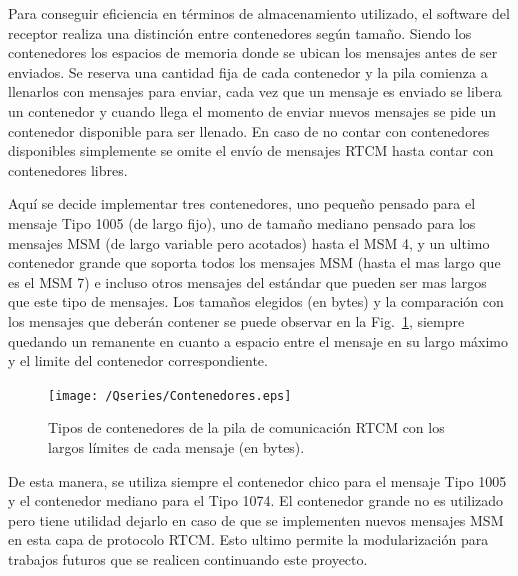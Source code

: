 \documentclass[a4paper,12pt,oneside,onecolumn,final,openright]{book}%
\begin{document}
	Para conseguir eficiencia en términos de almacenamiento utilizado, el software del receptor realiza una distinción entre contenedores según tamaño. Siendo los contenedores los espacios de memoria donde se ubican los mensajes antes de ser enviados. Se reserva una cantidad fija de cada contenedor y la pila comienza a llenarlos con mensajes para enviar, cada vez que un mensaje es enviado se libera un contenedor y cuando llega el momento de enviar nuevos mensajes se pide un contenedor disponible para ser llenado. En caso de no contar con contenedores disponibles simplemente se omite el envío de mensajes RTCM hasta contar con contenedores libres.
	
	 Aquí se decide implementar tres contenedores, uno pequeño pensado para el mensaje Tipo 1005 (de largo fijo), uno de tamaño mediano pensado para los mensajes MSM (de largo variable pero acotados) hasta el MSM 4, y un ultimo contenedor grande que soporta todos los mensajes MSM (hasta el mas largo que es el MSM 7) e incluso otros mensajes del estándar que pueden ser mas largos que este tipo de mensajes. Los tamaños elegidos (en bytes) y la comparación con los mensajes que deberán contener se puede observar en la Fig.~\ref{fig:contenedores}, siempre quedando un remanente en cuanto a espacio entre el mensaje en su largo máximo y el limite del contenedor correspondiente.
\begin{figure}
    \centering
	\texttt{[image: /Qseries/Contenedores.eps]}
    \caption{Tipos de contenedores de la pila de comunicación RTCM con los largos límites de cada mensaje (en bytes).}
    \label{fig:contenedores}
\end{figure}

	De esta manera, se utiliza siempre el contenedor chico para el mensaje Tipo 1005 y el contenedor mediano para el Tipo 1074. El contenedor grande no es utilizado pero tiene utilidad dejarlo en caso de que se implementen nuevos mensajes MSM en esta capa de protocolo RTCM. Esto ultimo permite la modularización para trabajos futuros que se realicen continuando este proyecto.
	
\end{document}
